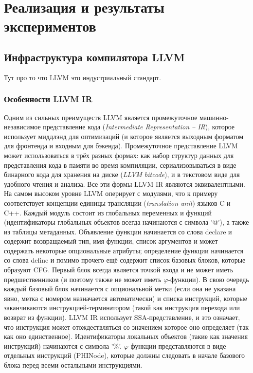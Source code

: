 \chapter{Реализация и результаты экспериментов}\label{ch:results}

\section{Инфраструктура компилятора LLVM}\label{sec:results/llvm}

Тут про то что LLVM это индустриальный стандарт.

\subsection{Особенности LLVM IR}\label{subsec:results/llvm/ir}

Одним из сильных преимуществ LLVM является промежуточное машинно-независимое представление кода (\textit{Intermediate Representation -- IR}), которое использует миддлэнд для оптимизаций (и которое является выходным форматом для фронтенда и входным для бэкенда). Промежуточное представление LLVM может использоваться в трёх разных формах: как набор структур данных для представления кода в памяти во время компиляции, сериализовываться в виде бинарного кода для хранения на диске (\textit{LLVM bitcode}), и в текстовом виде для удобного чтения и анализа. Все эти формы LLVM IR являются эквивалентными. На самом высоком уровне LLVM оперирует с модулями, что к примеру соответствует концепции единицы трансляции (\textit{translation unit}) языков C и C++. Каждый модуль состоит из глобальных переменных и функций (идентификаторы глобальных объектов всегда начинаются с символа '@'), а также из таблицы метаданных. Объявление функции начинается со слова declare и содержит возвращаемый тип, имя функции, список аргументов и может содержать некоторые опциональные атрибуты; определение функции начинается со слова define и помимо прочего ещё содержит список базовых блоков, которые образуют CFG. Первый блок всегда является точкой входа и не может иметь предшественников (и поэтому также не может иметь $\varphi$-функции). В свою очередь каждый базовый блок начинается с опциональной метки (если она не указана явно, метка с номером назначается автоматически) и списка инструкций, которые заканчиваются инструкцией-терминатором (такой как инструкция перехода или возврат из функции). LLVM IR использует SSA-представление, и это означает, что инструкция может отождествляться со значением которое оно определяет (так как оно единственное). Идентификаторы локальных объектов (такие как значения инструкций) начинаются с символа '\%'. $\varphi$-функции представляются в виде отдельных инструкций (PHINode), которые должны следовать в начале базового блока перед всеми остальными инструкциями.

